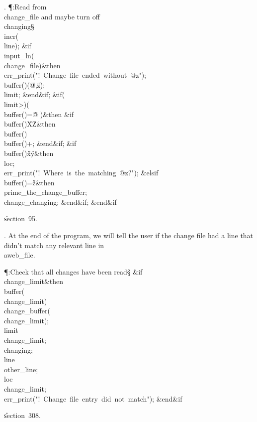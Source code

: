 . \P\?:Read from \\{change\_file} and maybe turn off \\{changing}\X\S\?%
\6
\\{incr}\?\1(\?\\{line}\?\2)\?;\6
\&{if}\1\1\?\8\R\?\\{input\_ln}\?\1(\?\\{change\_file}\?\2)\?\2\8\&{then}\6
\\{err\_print}\?\1(\?\.{"!\ Change\ file\ ended\ without\ @z"}\?\2)\?;\6
\\{buffer}\?\1(\?\to{}\?\2)\K\1(\?\H{@}\?,\?\H{z}\?\2)\?;\5
\\{limit}\?\K{};\2\6
\&{end}\8\2\&{if}\1;\6
\&{if}\1\1\?\8\1(\?\\{limit}\?>\?\2)\ANT\1(\?\\{buffer}\?\1(\?\2)=\?\H{@}%
\?\2)\?\2\8\&{then}\6
\&{if}\1\1\8\\{buffer}\?\1(\?\2)\in\?\H{X}\?\to\?\H{Z}\2\8\&{then}\6
\\{buffer}\?\1(\?\2)\K\?\\{buffer}\?\1(\?\2)+\?;%
\2\6
\&{end}\8\2\&{if}\1;\6
\&{if}\1\1\8\\{buffer}\?\1(\?\2)\in\?\H{x}\?\to\?\H{y}\2\8\&{then}\6
\\{loc}\?\K{};\5
\\{err\_print}\?\1(\?\.{"!\ Where\ is\ the\ matching\ @z?"}\?\2)\?;\6
\4\&{elsif}\1\8\\{buffer}\?\1(\?\2)=\?\H{z}\2\8\&{then}\6
\\{prime\_the\_change\_buffer};\5
\\{change\_changing};\2\6
\&{end}\8\2\&{if}\1;\2\6
\&{end}\8\2\&{if}\1\par
\U section~95.\fi

. At the end of the program, we will tell the user if the change file
had a line that didn't match any relevant line in \\{aweb\_file}.

\Y\P\?\4:Check that all changes have been read\X\S\?\6
\&{if}\1\1\8\\{change\_limit}\?\I{}\2\8\&{then}\6
\\{buffer}\?\1(\?\to\?\\{change\_limit}\?\2)\K\?\\{change\_buffer}\?\1(\?%
\to\?\\{change\_limit}\?\2)\?;\5
\\{limit}\?\K\?\\{change\_limit};\5
\\{changing}\?\K\?;\5
\\{line}\?\K\?\\{other\_line};\5
\\{loc}\?\K\?\\{change\_limit};\5
\\{err\_print}\?\1(\?\.{"!\ Change\ file\ entry\ did\ not\ match"}\?\2)\?;\2\6
\&{end}\8\2\&{if}\1\par
\U section~308\*.\fi

